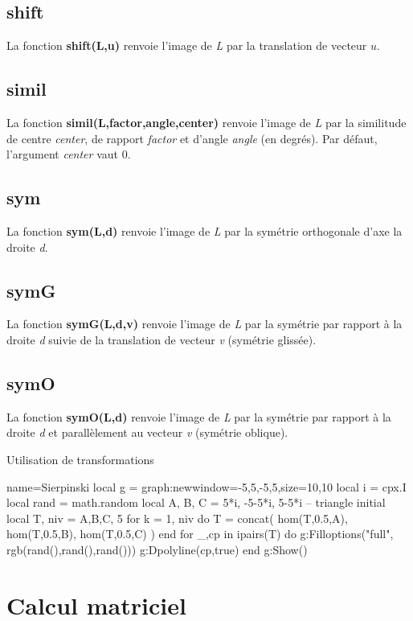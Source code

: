 \subsection{shift}
La fonction \textbf{shift(L,u)} renvoie l'image de \emph{L} par la translation de vecteur \(u\).

\subsection{simil}
La fonction \textbf{simil(L,factor,angle,center)} renvoie l'image de \emph{L} par la similitude de centre \emph{center}, de rapport \emph{factor} et d'angle \emph{angle} (en degrés). Par défaut, l'argument \emph{center} vaut 0.

\subsection{sym}
La fonction \textbf{sym(L,d)} renvoie l'image de \emph{L} par la symétrie orthogonale d'axe la droite \emph{d}.

\subsection{symG}
La fonction \textbf{symG(L,d,v)} renvoie l'image de \emph{L} par la symétrie par rapport à la droite \emph{d} suivie de la translation de vecteur \emph{v} (symétrie glissée).

\subsection{symO}
La fonction \textbf{symO(L,d)} renvoie l'image de \emph{L} par la symétrie par rapport à la droite \emph{d} et parallèlement au vecteur \emph{v} (symétrie oblique).

\begin{demo}{Utilisation de transformations}
\begin{luadraw}{name=Sierpinski}
local g = graph:new{window={-5,5,-5,5},size={10,10}}
local i = cpx.I
local rand = math.random
local A, B, C = 5*i, -5-5*i, 5-5*i -- triangle initial
local T, niv = {{A,B,C}}, 5
for k = 1, niv do
    T = concat( hom(T,0.5,A), hom(T,0.5,B), hom(T,0.5,C) )
end
for _,cp in ipairs(T) do
    g:Filloptions("full", rgb(rand(),rand(),rand()))
    g:Dpolyline(cp,true)
end
g:Show()
\end{luadraw}
\end{demo}

\section{Calcul matriciel}

